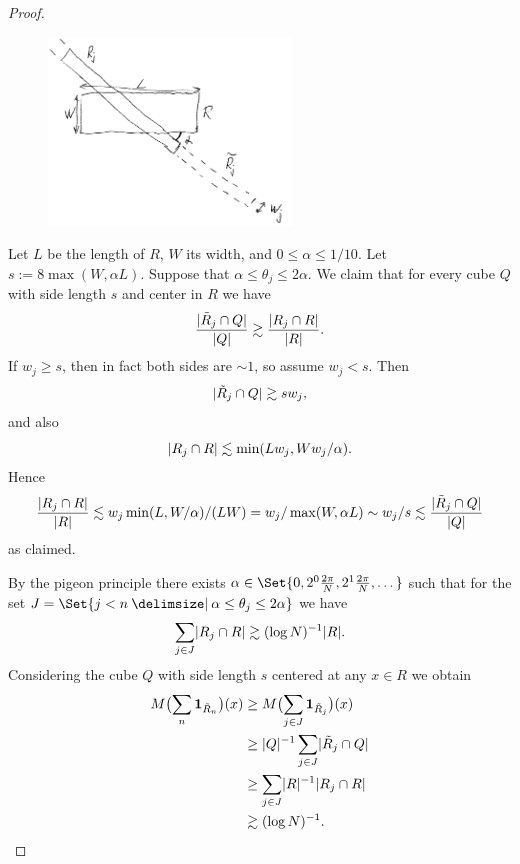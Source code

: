 \begin{proof}
\begin{figure}
\begin{center}
\includegraphics[height=5cm]{Stromberg-covering.png}
\end{center}
\end{figure}

Let $L$ be the length of $R$, $W$ its width, and $0 \leq \alpha \leq 1/10$.
Let $s := 8 \max ( W, \alpha L )$.
Suppose that $\alpha \leq \theta_{j} \leq 2 \alpha$.
We claim that for every cube $Q$ with side length $s$ and center in $R$ we have
\[
\frac{ \lvert\tilde{R}_{j} \cap Q\rvert }{ \lvert Q\rvert }
\gtrsim
\frac{ \lvert R_{j} \cap R\rvert }{ \lvert R\rvert }.
\]
If $w_{j} \geq s$, then in fact both sides are $\sim 1$, so assume $w_{j} < s$.
Then
\[
\lvert\tilde{R}_{j} \cap Q\rvert \gtrsim s w_{j},
\]
and also
\[
\lvert R_{j} \cap R \rvert \lesssim \min( Lw_{j}, Ww_{j}/\alpha ).
\]
Hence
\[
\frac{ \lvert R_{j} \cap R\rvert }{ \lvert R\rvert }
\lesssim
w_{j} \min( L, W/\alpha ) / (LW)\\
=
w_{j} / \max( W, \alpha L )
\sim
w_{j} / s
\lesssim
\frac{ \lvert\tilde{R}_{j} \cap Q\rvert }{ \lvert Q\rvert }
\]
as claimed.

By the pigeon principle there exists $\alpha \in \Set{ 0, 2^{0} \frac{2\pi}{N}, 2^{1}\frac{2\pi}{N}, \dotsc }$ such that for the set $J = \Set{ j<n \given \alpha \leq \theta_{j} \leq 2 \alpha }$ we have
\[
\sum_{j \in J} \lvert R_{j} \cap R \rvert
\gtrsim
(\log N)^{-1} \lvert R \rvert.
\]
Considering the cube $Q$ with side length $s$ centered at any $x \in R$ we obtain
\begin{align*}
M \bigl( \sum_{n} \mathbf{1}_{\tilde{R}_{n}} \bigr) (x)
&\geq
M \bigl( \sum_{j\in J} \mathbf{1}_{\tilde{R}_{j}} \bigr) (x)\\
&\geq
\lvert Q\rvert^{-1} \sum_{j\in J} \lvert\tilde{R}_{j} \cap Q\rvert\\
&\geq
\sum_{j\in J} \lvert R\rvert^{-1} \lvert R_{j} \cap R\rvert\\
&\gtrsim
(\log N)^{-1}.
\qedhere
\end{align*}
\end{proof}

